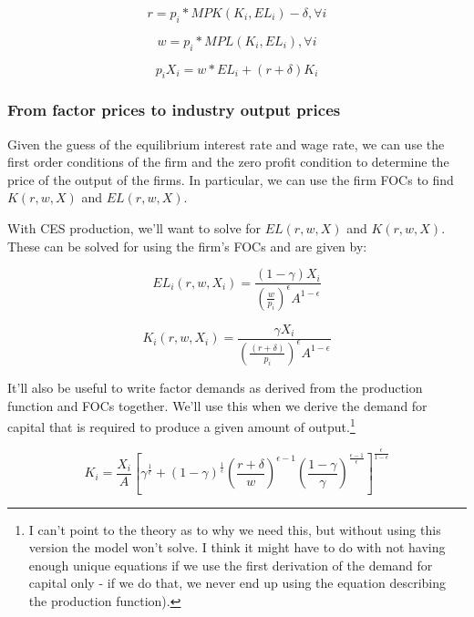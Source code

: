 \documentclass[letterpaper,12pt]{article}
\theoremstyle{definition}
\begin{document}
\begin{spacing}{1.5}
\begin{equation}
r = p_{i}*MPK(K_{i},EL_{i}) - \delta, \forall i
\end{equation}

\begin{equation}
w = p_{i}*MPL(K_{i},EL_{i}), \forall i
\end{equation}

\begin{equation}
p_{i}X_{i}= w*EL_{i} + (r+\delta)K_{i}
\end{equation}
 
 
\subsubsection*{From factor prices to industry output prices}

Given the guess of the equilibrium interest rate and wage rate, we can use the first order conditions of the firm and the zero profit condition to determine the price of the output of the firms.  In particular, we can use the firm FOCs to find $K(r,w,X)$ and $EL(r,w,X)$.  

With CES production, we'll want to solve for $EL(r,w,X)$ and $K(r,w,X)$.  These can be solved for using the firm's FOCs and are given by:

\begin{equation}
\label{eqn:l_demand}
EL_{i}(r,w,X_{i})=\frac{(1-\gamma)X_{i}}{\left(\frac{w}{p_{i}}\right)^{\epsilon}A^{1-\epsilon}}
\end{equation}



\begin{equation}
\label{eqn:k_demand}
K_{i}(r,w,X_{i})=\frac{\gamma X_{i}}{\left(\frac{(r+\delta)}{p_{i}}\right)^{\epsilon}A^{1-\epsilon}}
\end{equation}


It'll also be useful to write factor demands as derived from the production function and FOCs together.  We'll use this when we derive the demand for capital that is required to produce a given amount of output.\footnote{I can't point to the theory as to why we need this, but without using this version the model won't solve.  I think it might have to do with not having enough unique equations if we use the first derivation of the demand for capital only - if we do that, we never end up using the equation describing the production function).} 

\begin{equation}
\label{eqn:k_demand2}
K_{i} = \frac{X_{i}}{A}\left[\gamma^{\frac{1}{\epsilon}}+(1-\gamma)^{\frac{1}{\epsilon}}\left(\frac{r+\delta}{w}\right)^{\epsilon-1}\left(\frac{1-\gamma}{\gamma}\right)^{\frac{\epsilon-1}{\epsilon}}\right]^{\frac{\epsilon}{1-\epsilon}}
\end{equation}


\end{spacing}
\end{document}
